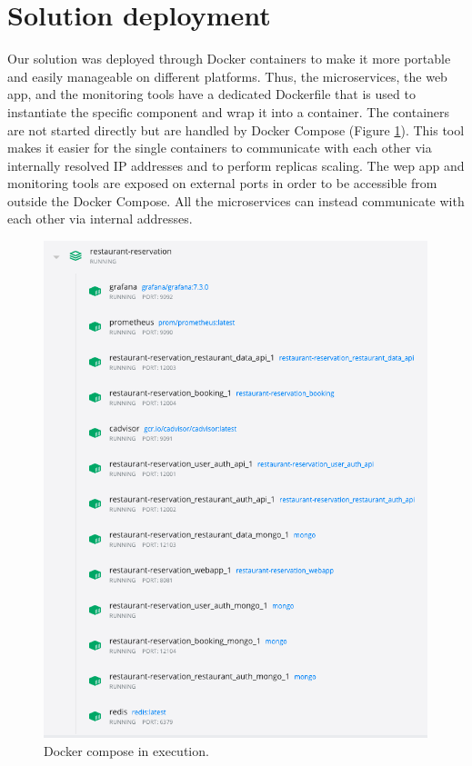 \section{Solution deployment}
Our solution was deployed through Docker containers to make it more portable
and easily manageable on different platforms. Thus, the microservices, the
web app, and the monitoring tools have a dedicated Dockerfile that is
used to instantiate the specific component and wrap it into a container.
The containers are not started directly but are handled by Docker Compose
(Figure \ref{fig:docker_compose}).
This tool makes it easier for the single containers to communicate with each
other via internally resolved IP addresses and to perform replicas scaling.
The wep app and monitoring tools are exposed on external ports in order
to be accessible from outside the Docker Compose. All the microservices can
instead communicate with each other via internal addresses.

\vspace{0.5in}

\begin{figure}[h]
    \begin{center}
        \includegraphics[height=5.7in]{./images/docker_compose.png}
    \end{center}
    \caption{Docker compose in execution.}
    \label{fig:docker_compose}
\end{figure}
\clearpage
